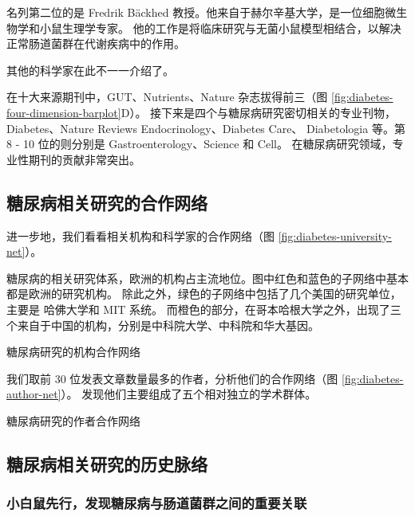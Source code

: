 \documentclass[]{ctexbook}
\begin{document}
名列第二位的是 Fredrik Bäckhed 教授。他来自于赫尔辛基大学，是一位细胞微生物学和小鼠生理学专家。
他的工作是将临床研究与无菌小鼠模型相结合，以解决正常肠道菌群在代谢疾病中的作用。

其他的科学家在此不一一介绍了。

在十大来源期刊中，GUT、Nutrients、Nature 杂志拔得前三（图 \ref{fig:diabetes-four-dimension-barplot}D）。
接下来是四个与糖尿病研究密切相关的专业刊物，Diabetes、Nature Reviews Endocrinology、Diabetes Care、
Diabetologia 等。第 8 - 10 位的则分别是 Gastroenterology、Science 和 Cell。
在糖尿病研究领域，专业性期刊的贡献非常突出。

\hypertarget{ux7cd6ux5c3fux75c5ux76f8ux5173ux7814ux7a76ux7684ux5408ux4f5cux7f51ux7edc}{%
\subsection{糖尿病相关研究的合作网络}\label{ux7cd6ux5c3fux75c5ux76f8ux5173ux7814ux7a76ux7684ux5408ux4f5cux7f51ux7edc}}

进一步地，我们看看相关机构和科学家的合作网络（图 \ref{fig:diabetes-university-net}）。

糖尿病的相关研究体系，欧洲的机构占主流地位。图中红色和蓝色的子网络中基本都是欧洲的研究机构。
除此之外，绿色的子网络中包括了几个美国的研究单位，主要是 哈佛大学和 MIT 系统。
而橙色的部分，在哥本哈根大学之外，出现了三个来自于中国的机构，分别是中科院大学、中科院和华大基因。

\hypertarget{htmlwidget-49bb7959cb26135376a7}{}

\label{fig:diabetes-university-net}糖尿病研究的机构合作网络

我们取前 30 位发表文章数量最多的作者，分析他们的合作网络（图 \ref{fig:diabetes-author-net}）。
发现他们主要组成了五个相对独立的学术群体。

\hypertarget{htmlwidget-9568df7fd57a0a5cdc87}{}

\label{fig:diabetes-author-net}糖尿病研究的作者合作网络

\hypertarget{ux7cd6ux5c3fux75c5ux76f8ux5173ux7814ux7a76ux7684ux5386ux53f2ux8109ux7edc}{%
\subsection{糖尿病相关研究的历史脉络}\label{ux7cd6ux5c3fux75c5ux76f8ux5173ux7814ux7a76ux7684ux5386ux53f2ux8109ux7edc}}

\hypertarget{ux5c0fux767dux9f20ux5148ux884cux53d1ux73b0ux7cd6ux5c3fux75c5ux4e0eux80a0ux9053ux83ccux7fa4ux4e4bux95f4ux7684ux91cdux8981ux5173ux8054}{%
\subsubsection{小白鼠先行，发现糖尿病与肠道菌群之间的重要关联}\label{ux5c0fux767dux9f20ux5148ux884cux53d1ux73b0ux7cd6ux5c3fux75c5ux4e0eux80a0ux9053ux83ccux7fa4ux4e4bux95f4ux7684ux91cdux8981ux5173ux8054}}
\end{document}
